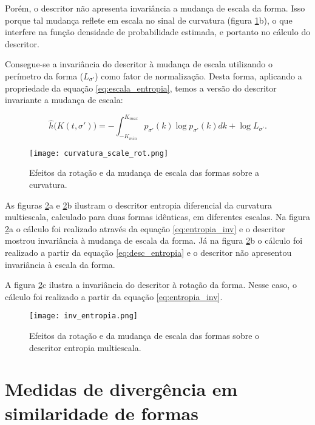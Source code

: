 Porém, o descritor não apresenta invariância a mudança de escala da forma. Isso porque tal mudança reflete em escala no sinal de curvatura (figura \ref{fig:curv_scale_rot}b), o que interfere na função densidade de probabilidade estimada, e portanto no cálculo do descritor.

Consegue-se a invariância do descritor à mudança de escala utilizando o perímetro da forma ($L_{\sigma'}$) como fator de normalização. Desta forma, aplicando a  propriedade da equação \ref{eq:escala_entropia}, temos a versão do descritor invariante a mudança de escala:

\begin{equation}\label{eq:entropia_inv}
\hat{h}\big(K(t,\sigma')\big) = -\int_{-K_{min}}^{K_{max}} p_{\sigma'}(k)\log{p_{\sigma'}(k)}dk+\log{L_{\sigma'}}\text{.}
\end{equation}

\begin{figure}[]
\caption{\label{fig:curv_scale_rot}Efeitos da rotação e da mudança de escala das formas sobre a curvatura.}
\texttt{[image: curvatura\_scale\_rot.png]}
\end{figure}

As figuras \ref{fig:entropia_inv}a e \ref{fig:entropia_inv}b ilustram o descritor entropia diferencial da curvatura multiescala, calculado para duas formas idênticas, em diferentes escalas. Na figura \ref{fig:entropia_inv}a o cálculo foi realizado através da equação \ref{eq:entropia_inv} e o descritor mostrou invariância à mudança de escala da forma. Já na figura \ref{fig:entropia_inv}b o cálculo foi realizado a partir da equação \ref{eq:desc_entropia} e o descritor não apresentou invariância à escala da forma.

A figura \ref{fig:entropia_inv}c ilustra a invariância do descritor à rotação da forma. Nesse caso, o cálculo foi realizado a partir da equação \ref{eq:entropia_inv}.

\begin{figure}[]
\caption{\label{fig:entropia_inv}Efeitos da rotação e da mudança de escala das formas sobre o descritor entropia multiescala.}
\texttt{[image: inv\_entropia.png]}
\end{figure}

\section{Medidas de divergência em similaridade de formas \label{Sec:divergente}}

